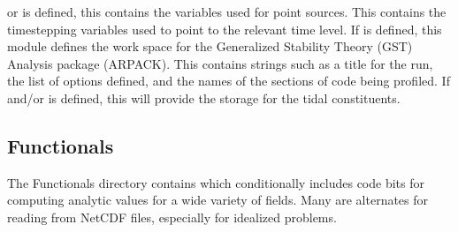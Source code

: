 \begin{klist}
    or  is defined, this contains the variables used
    for point sources.
   This contains the timestepping variables used to
    point to the relevant time level.
   If  is
    defined, this module defines the work space for the Generalized
    Stability Theory (GST) Analysis package (ARPACK).
   This contains strings such as a title for the run,
    the list of  options defined, and the names of the sections of
    code being profiled.
    If  and/or  is
    defined, this will provide the storage for the tidal constituents.
\end{klist}

\subsection{Functionals}
\label{Functionals}
The Functionals directory contains  which
conditionally includes code bits for computing analytic values for a
wide variety of fields. Many are alternates for reading from NetCDF
files, especially for idealized problems.
